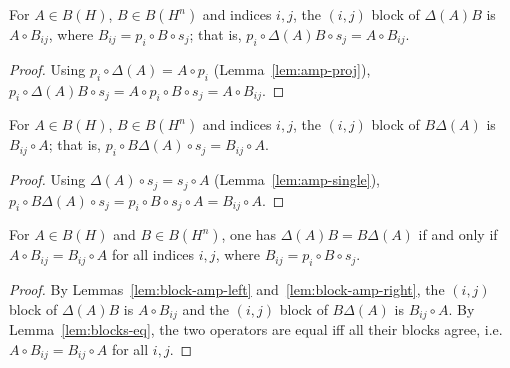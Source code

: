 \begin{lemma}
    \label{lem:block-amp-left}
    \leanok
    For $A \in B(H)$, $B \in B(H^n)$ and indices $i, j$, the $(i,j)$ block of
    $\Delta(A) B$ is $A \circ B_{ij}$, where $B_{ij} = p_i \circ B \circ s_j$;
    that is, $p_i \circ \Delta(A) B \circ s_j = A \circ B_{ij}$.
\end{lemma}
\begin{proof}
    Using $p_i \circ \Delta(A) = A \circ p_i$ (Lemma~\ref{lem:amp-proj}),
    $p_i \circ \Delta(A) B \circ s_j = A \circ p_i \circ B \circ s_j
    = A \circ B_{ij}$.
\end{proof}

\begin{lemma}
    \label{lem:block-amp-right}
    \leanok
    For $A \in B(H)$, $B \in B(H^n)$ and indices $i, j$, the $(i,j)$ block of
    $B \Delta(A)$ is $B_{ij} \circ A$; that is,
    $p_i \circ B \Delta(A) \circ s_j = B_{ij} \circ A$.
\end{lemma}
\begin{proof}
    Using $\Delta(A) \circ s_j = s_j \circ A$ (Lemma~\ref{lem:amp-single}),
    $p_i \circ B \Delta(A) \circ s_j = p_i \circ B \circ s_j \circ A
    = B_{ij} \circ A$.
\end{proof}

\begin{lemma}
    \label{lem:amp-commute-iff-blocks}
    \leanok
    For $A \in B(H)$ and $B \in B(H^n)$, one has $\Delta(A) B = B \Delta(A)$ if
    and only if $A \circ B_{ij} = B_{ij} \circ A$ for all indices $i, j$, where
    $B_{ij} = p_i \circ B \circ s_j$.
\end{lemma}
\begin{proof}
    By Lemmas~\ref{lem:block-amp-left} and~\ref{lem:block-amp-right}, the $(i,j)$
    block of $\Delta(A) B$ is $A \circ B_{ij}$ and the $(i,j)$ block of
    $B \Delta(A)$ is $B_{ij} \circ A$. By Lemma~\ref{lem:blocks-eq}, the two
    operators are equal iff all their blocks agree, i.e.\
    $A \circ B_{ij} = B_{ij} \circ A$ for all $i, j$.
\end{proof}

